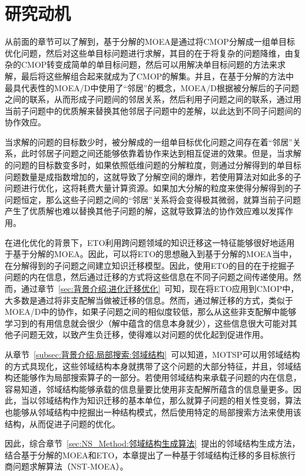 \section{研究动机}
\label{sec:NST:研究动机}
从前面的章节可以了解到，基于分解的MOEA是通过将CMOP分解成一组单目标优化问题，然后对这些单目标问题进行求解，其目的在于将复杂的问题降维，由复杂的CMOP转变成简单的单目标问题，然后可以用解决单目标问题的方法来求解，最后将这些解组合起来就成为了CMOP的解集。并且，在基于分解的方法中最具代表性的MOEA/D中使用了“邻居”的概念，MOEA/D根据被分解后的子问题之间的联系，从而形成子问题间的邻居关系，然后利用子问题之间的联系，通过用当前子问题中的优质解来替换其他邻居子问题中的差解，以此达到不同子问题间的协作效应。
\par
当求解的问题的目标数少时，被分解成的一组单目标优化问题之间存在着“邻居”关系，此时邻居子问题之间还能够依靠着协作来达到相互促进的效果。但是，当求解的问题的目标数变多时，如果依照低维问题的分解粒度，则通过分解得到的单目标问题数量是成指数增加的，这就导致了分解空间的爆炸，若使用算法对如此多的子问题进行优化，这将耗费大量计算资源。如果加大分解的粒度来使得分解得到的子问题恒定，那么这些子问题之间的“邻居”关系将会变得极其微弱，就算当前子问题产生了优质解也难以替换其他子问题的解，这就导致算法的协作效应难以发挥作用。
\par
在进化优化的背景下，ETO利用跨问题领域的知识迁移这一特征能够很好地适用于基于分解的MOEA。因此，可以将ETO的思想融入到基于分解的MOEA当中，在分解得到的子问题之间建立知识迁移模型。因此，使用ETO的目的在于挖掘子问题的内在信息，然后通过迁移的方式将这些信息在不同子问题之间传递使用。然而，通过章节~\ref{sec:背景介绍:进化迁移优化}~可知，现在将ETO应用到CMOP中，大多数是通过将非支配解当做被迁移的信息。然而，通过解迁移的方式，类似于MOEA/D中的协作，如果子问题之间的相似度较低，那么从这些非支配解中能够学习到的有用信息就会很少（解中蕴含的信息本身就少），这些信息很大可能对其他子问题无效，以致产生负迁移，使得难以对问题的优化起到促进作用。
\par
从章节~\ref{subsec:背景介绍:局部搜索:邻域结构}~可以知道，MOTSP可以用邻域结构的方式具现化，这些邻域结构本身就携带了这个问题的大部分特征，并且，邻域结构还能够作为局部搜索算子的一部分。若使用邻域结构来承载子问题的内在信息，容易知道，邻域结构能够承载的信息量要比使用非支配解所蕴含的信息量更多。因此，当以邻域结构作为知识迁移的基本单位，那么就算子问题的相关性变弱，算法也能够从邻域结构中挖掘出一种结构模式，然后使用特定的局部搜索方法来使用该结构，从而促进子问题的优化。
\par
因此，综合章节~\ref{sec:NS_Method:邻域结构生成算法}~提出的邻域结构生成方法，结合基于分解的MOEA和ETO，本章提出了一种基于邻域结构迁移的多目标旅行商问题求解算法（NST-MOEA）。

